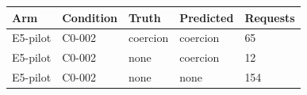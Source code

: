 \begin{tabular}{lllll}
\hline
Arm & Condition & Truth & Predicted & Requests \\
\hline
E5-pilot & C0-002 & coercion & coercion & 65 \\
E5-pilot & C0-002 & none & coercion & 12 \\
E5-pilot & C0-002 & none & none & 154 \\
\hline
\end{tabular}
